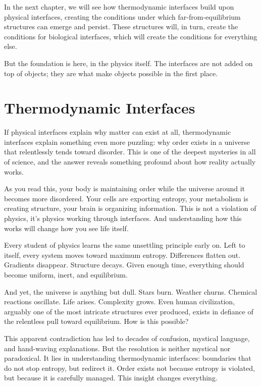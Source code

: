 \documentclass[
  openright]{book}
\begin{document}
In the next chapter, we will see how
thermodynamic interfaces build upon
physical interfaces, creating the conditions under which
far-from-equilibrium structures can emerge and persist. These structures
will, in turn, create the conditions for biological interfaces, which
will create the conditions for everything else.

But the foundation is here, in the physics itself. The interfaces are
not added on top of objects; they are what make objects possible in the
first place.

\chapter{\texorpdfstring{Thermodynamic
Interfaces}{Thermodynamic Interfaces}}\label{thermodynamic-interfaces}

If physical interfaces explain why matter can exist at all,
thermodynamic interfaces explain something even
more puzzling: why order exists in a universe that relentlessly tends
toward disorder. This is one of the deepest mysteries in all of science,
and the answer reveals something profound about how reality actually
works.

As you read this, your body is maintaining order while the universe
around it becomes more disordered. Your cells are exporting entropy,
your metabolism is creating structure, your brain is
organizing information. This is not a violation of physics, it's physics
working through interfaces. And understanding how this works will change
how you see life itself.

Every student of physics learns the same unsettling principle early on.
Left to itself, every system moves toward maximum entropy. Differences
flatten out. Gradients disappear. Structure decays.
Given enough time, everything should become uniform, inert, and
equilibrium.

And yet, the universe is anything but dull. Stars burn. Weather churns.
Chemical reactions oscillate. Life arises. Complexity grows. Even human
civilization, arguably one of the most intricate structures ever
produced, exists in defiance of the relentless pull toward equilibrium.
How is this possible?

This apparent contradiction has led to decades of confusion, mystical
language, and hand-waving explanations. But the resolution is neither
mystical nor paradoxical. It lies in understanding thermodynamic
interfaces: boundaries that do not stop entropy, but redirect it. Order
exists not because entropy is violated, but because it is carefully
managed. This insight changes everything.
\end{document}
